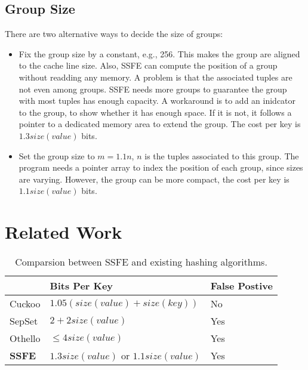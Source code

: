 \documentclass{article}
\begin{document}
\subsection{Group Size}

There are two alternative ways to decide the size of groups:

\begin{itemize}
    \item Fix the group size by a constant, e.g., 256. This makes the group are aligned to the cache line size. Also, SSFE can compute the position of a group without readding any memory. A problem is that the associated tuples are not even among groups. SSFE needs more groups to guarantee the group with most tuples has enough capacity. A workaround is to add an inidcator to the group, to show whether it has enough space. If it is not, it follows a pointer to a dedicated memory area to extend the group. The cost per key is $1.3 size(value)$ bits.
    \item Set the group size to $m = 1.1n$, $n$ is the tuples associated to this group. The program needs a pointer array to index the position of each group, since sizes are varying. However, the group can be more compact, the cost per key is $1.1 size(value)$ bits.
\end{itemize}

\section{Related Work}
\label{sec:related_work}

\begin{table}[]
    \centering
    \begin{tabular}{lll}
        \hline
                  & Bits Per Key                     & False Postive \\ \hline\hline
    Cuckoo\cite{zhou2013scalable}        & $1.05 (size(value) + size(key))$ & No            \\ \hline
    SepSet\cite{zhou2015scaling}        & $2 + 2 size(value)$              & Yes           \\ \hline
    Othello\cite{yu2018memory}       & $\le 4 size(value)$              & Yes           \\ \hline
    \textbf{SSFE} & $1.3 size(value)$  or $1.1 size(value)$ & Yes     
    \\ \hline
    \end{tabular}
    \caption{Comparsion between SSFE and existing hashing algorithms.}
    \label{tab:comparsion}
\end{table}
\end{document}
